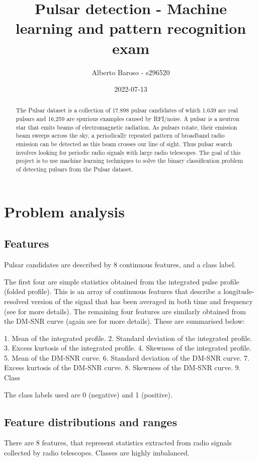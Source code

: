 \documentclass[12pt,a4paper]{article}
\begin{document}
\title{Pulsar detection - Machine learning and pattern recognition exam}
\author{Alberto Baroso - s296520}
\date{2022-07-13}
\maketitle

\begin{abstract}
    The Pulsar dataset \cite{stw656} is a collection of 17.898 pulsar candidates of which 1.639 are real pulsars and 16,259 are spurious examples caused by RFI/noise.
    A pulsar is a neutron star that emits beams of electromagnetic radiation.
    As pulsars rotate, their emission beam sweeps across the sky, a periodically repeated pattern of broadband radio emission can be detected as this beam crosses our line of sight. 
    Thus pulsar search involves looking for periodic radio signals with large radio telescopes.
    The goal of this project is to use machine learning techniques to solve the binary classification problem of detecting pulsars from the Pulsar dataset.
\end{abstract}

\tableofcontents


\section{Problem analysis}

\subsection{Features}

Pulsar candidates are described by 8 continuous features, and a class label. 

The first four are simple statistics obtained from the integrated pulse profile (folded profile). 
This is an array of continuous features that describe a longitude-resolved version of the signal that has been averaged in both time and frequency (see \cite{Lyon2016} for more details). 
The remaining four features are similarly obtained from the DM-SNR curve (again see \cite{Lyon2016} for more details). 
These are summarised below:

1. Mean of the integrated profile.
2. Standard deviation of the integrated profile.
3. Excess kurtosis of the integrated profile.
4. Skewness of the integrated profile.
5. Mean of the DM-SNR curve.
6. Standard deviation of the DM-SNR curve.
7. Excess kurtosis of the DM-SNR curve.
8. Skewness of the DM-SNR curve.
9. Class

The class labels used are 0 (negative) and 1 (positive).


\subsection{Feature distributions and ranges}


There are 8 features, that represent statistics extracted from radio signals collected by radio telescopes.
Classes are highly imbalanced.



\end{document}
